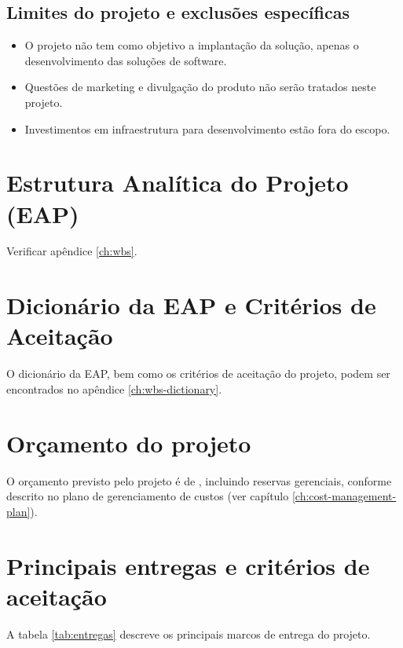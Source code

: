\subsection{Limites do projeto e exclusões específicas}

\begin{itemize}
	\item O projeto não tem como objetivo a implantação da solução, apenas o desenvolvimento das soluções de software.
	\item Questões de marketing e divulgação do produto não serão tratados neste projeto.
	\item Investimentos em infraestrutura para desenvolvimento estão fora do escopo.
\end{itemize}

\section{Estrutura Analítica do Projeto (EAP)}

Verificar apêndice \ref{ch:wbs}.

\section{Dicionário da EAP e Critérios de Aceitação}

O dicionário da EAP, bem como os critérios de aceitação do projeto, podem ser encontrados no apêndice \ref{ch:wbs-dictionary}.

\section{Orçamento do projeto}

O orçamento previsto pelo projeto é de \realBudget{}, incluindo reservas gerenciais, conforme descrito no plano de gerenciamento de custos (ver capítulo \ref{ch:cost-management-plan}).

\section{Principais entregas e critérios de aceitação}

A tabela \ref{tab:entregas} descreve os principais marcos de entrega do projeto.

